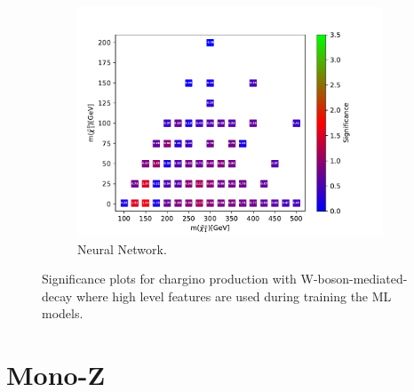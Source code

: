 \begin{figure}[H]
    \begin{subfigure}[t!]{0.49\textwidth}
    \includegraphics[width = \textwidth]{Figures/Significances/significance_NN_WW_High_level.pdf}
    \caption{Neural Network.}
        \label{fig:signHighWWNN}
    \end{subfigure}
    \caption{Significance plots for chargino production with W-boson-mediated-decay where high level features are used during training the ML models.}
    \label{fig:signHighWW}
\end{figure}


































\section{Mono-Z}






